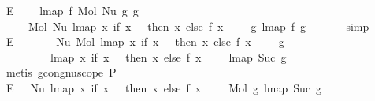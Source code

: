 \begin{isabellebody}
\ E{}{\isacharcolon}{\kern0pt}\isanewline
\ \ \ \ {\isachardoublequoteopen}lmap\ f\ {\isacharparenleft}{\kern0pt}Mol\ {\isacharparenleft}{\kern0pt}Nu\ g{}{\isacharparenright}{\kern0pt}\ g{}{\isacharparenright}{\kern0pt}\ {\isacharequal}{\kern0pt}\isanewline
\ \ \ \ \ Mol\ {\isacharparenleft}{\kern0pt}Nu\ {\isacharparenleft}{\kern0pt}lmap\ {\isacharparenleft}{\kern0pt}{\isasymlambda}x{\isachardot}{\kern0pt}\ if\ x\ {\isacharequal}{\kern0pt}\ {}\ then\ x\ else\ f\ {\isacharparenleft}{\kern0pt}x\ {\isacharminus}{\kern0pt}\ {}{\isacharparenright}{\kern0pt}\ {\isacharplus}{\kern0pt}\ {}{\isacharparenright}{\kern0pt}\ g{}{\isacharparenright}{\kern0pt}{\isacharparenright}{\kern0pt}\ {\isacharparenleft}{\kern0pt}lmap\ f\ g{}{\isacharparenright}{\kern0pt}{\isachardoublequoteclose}\isanewline
\ \ \ \ \ \isamarkupfalse%
\ simp\isanewline
\ \ \isamarkupfalse%
\ E{}{\isacharcolon}{\kern0pt}\ {\isachardoublequoteopen}{\isachardot}{\kern0pt}{\isachardot}{\kern0pt}{\isachardot}{\kern0pt}\ {\isasymsimeq}\isanewline
\ \ \ \ \ Nu\ {\isacharparenleft}{\kern0pt}Mol\ {\isacharparenleft}{\kern0pt}lmap\ {\isacharparenleft}{\kern0pt}{\isasymlambda}x{\isachardot}{\kern0pt}\ if\ x\ {\isacharequal}{\kern0pt}\ {}\ then\ x\ else\ f\ {\isacharparenleft}{\kern0pt}x\ {\isacharminus}{\kern0pt}\ {}{\isacharparenright}{\kern0pt}\ {\isacharplus}{\kern0pt}\ {}{\isacharparenright}{\kern0pt}\ g{}{\isacharparenright}{\kern0pt}\isanewline
\ \ \ \ \ \ \ \ \ {\isacharparenleft}{\kern0pt}lmap\ {\isacharparenleft}{\kern0pt}{\isasymlambda}x{\isachardot}{\kern0pt}\ if\ x\ {\isacharequal}{\kern0pt}\ {}\ then\ x\ else\ f\ {\isacharparenleft}{\kern0pt}x\ {\isacharminus}{\kern0pt}\ {}{\isacharparenright}{\kern0pt}\ {\isacharplus}{\kern0pt}\ {}{\isacharparenright}{\kern0pt}\ {\isacharparenleft}{\kern0pt}lmap\ Suc\ g{}{\isacharparenright}{\kern0pt}{\isacharparenright}{\kern0pt}{\isacharparenright}{\kern0pt}{\isachardoublequoteclose}\isanewline
\ \ \ \ \isamarkupfalse%
\ {\isacharparenleft}{\kern0pt}metis\ gcong{\isachardot}{\kern0pt}nu{\isacharunderscore}{\kern0pt}scope\ P{}{\isacharparenright}{\kern0pt}\isanewline
\ \ \isamarkupfalse%
\ E{}{\isacharcolon}{\kern0pt}\ {\isachardoublequoteopen}{\isachardot}{\kern0pt}{\isachardot}{\kern0pt}{\isachardot}{\kern0pt}\ {\isacharequal}{\kern0pt}\ Nu\ {\isacharparenleft}{\kern0pt}lmap\ {\isacharparenleft}{\kern0pt}{\isasymlambda}x{\isachardot}{\kern0pt}\ if\ x\ {\isacharequal}{\kern0pt}\ {}\ then\ x\ else\ f\ {\isacharparenleft}{\kern0pt}x\ {\isacharminus}{\kern0pt}\ {}{\isacharparenright}{\kern0pt}\ {\isacharplus}{\kern0pt}\ {}{\isacharparenright}{\kern0pt}\ {\isacharparenleft}{\kern0pt}Mol\ g{}\ {\isacharparenleft}{\kern0pt}lmap\ Suc\ g{}{\isacharparenright}{\kern0pt}{\isacharparenright}{\kern0pt}{\isacharparenright}{\kern0pt}{\isachardoublequoteclose}\isanewline

\end{isabellebody}
